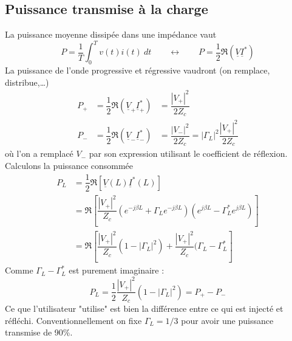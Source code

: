 	\subsection{Puissance transmise à la charge}
	La puissance moyenne dissipée dans une impédance vaut 
	\begin{equation}
	P = \dfrac{1}{T}\int_0^T v(t)i(t)\ dt\qquad\leftrightarrow\qquad P=\dfrac{1}{2}
	\Re(\underline{V}\underline{I}^*)
	\end{equation}
	La puissance de l'onde progressive et régressive vaudront (on remplace, distribue,\dots) 
	\begin{equation}
	\begin{array}{lll}
	P_+ &= \dfrac{1}{2}	\Re(\underline{V}_+\underline{I}_+^*) &= \dfrac{|V_+|^2}{2Z_c}\\
	P_- &= \dfrac{1}{2}	\Re(\underline{V}_-\underline{I}_-^*) &= \dfrac{|V_-|^2}{2Z_c}	 
	= |\Gamma_L|^2\dfrac{|V_+|^2}{2Z_c}
	\end{array}
	\end{equation}
	où l'on a remplacé $V_-$ par son expression utilisant le coefficient de réflexion.
	Calculons la puissance consommée
	\begin{equation}
	\begin{array}{ll}
	P_L &= \dfrac{1}{2}\Re[\underline{V}(L)\underline{I}^*(L)]\\
	&= \Re\left[\dfrac{|V_+|^2}{Z_c}\left(e^{-j\beta L}+\Gamma_Le^{-j\beta L}\right)
	\left(e^{j\beta L}-\Gamma_L^*e^{j\beta L}\right)\right]\\
	&=\Re\left[\dfrac{|V_+|^2}{Z_c}(1-|\Gamma_L|^2) + \dfrac{|V_+|^2}{Z_c}(\Gamma_L-
	\Gamma_L^*\right]
	\end{array}
	\end{equation}
	Comme $\Gamma_L-\Gamma_L^*$ est purement imaginaire :
	\begin{equation}
	P_L = \dfrac{1}{2}\dfrac{|V_+|^2}{Z_c}(1-|\Gamma_L|^2) = P_+-P_-
	\end{equation}
	Ce que l'utilisateur "utilise" est bien la différence entre ce qui est injecté et 
	réfléchi. Conventionnellement on fixe $\Gamma_L=1/3$ pour avoir une puissance 
	transmise de 90\%.
	
